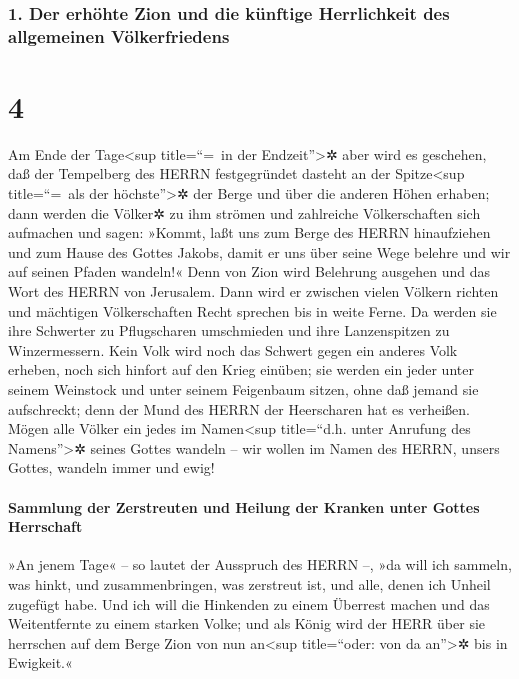 \hypertarget{der-erhuxf6hte-zion-und-die-kuxfcnftige-herrlichkeit-des-allgemeinen-vuxf6lkerfriedens}{%
\subsubsection{1. Der erhöhte Zion und die künftige Herrlichkeit des
allgemeinen
Völkerfriedens}\label{der-erhuxf6hte-zion-und-die-kuxfcnftige-herrlichkeit-des-allgemeinen-vuxf6lkerfriedens}}

\hypertarget{section-3}{%
\section{4}\label{section-3}}

 Am Ende der Tage\textless sup title=``=~in der
Endzeit''\textgreater✲ aber wird es geschehen, daß der Tempelberg des
HERRN festgegründet dasteht an der Spitze\textless sup title=``=~als der
höchste''\textgreater✲ der Berge und über die anderen Höhen erhaben;
dann werden die Völker✲ zu ihm strömen  und zahlreiche
Völkerschaften sich aufmachen und sagen: »Kommt, laßt uns zum Berge des
HERRN hinaufziehen und zum Hause des Gottes Jakobs, damit er uns über
seine Wege belehre und wir auf seinen Pfaden wandeln!« Denn von Zion
wird Belehrung ausgehen und das Wort des HERRN von Jerusalem.
 Dann wird er zwischen vielen Völkern richten und
mächtigen Völkerschaften Recht sprechen bis in weite Ferne. Da werden
sie ihre Schwerter zu Pflugscharen umschmieden und ihre Lanzenspitzen zu
Winzermessern. Kein Volk wird noch das Schwert gegen ein anderes Volk
erheben, noch sich hinfort auf den Krieg einüben;  sie
werden ein jeder unter seinem Weinstock und unter seinem Feigenbaum
sitzen, ohne daß jemand sie aufschreckt; denn der Mund des HERRN der
Heerscharen hat es verheißen.  Mögen alle Völker ein jedes
im Namen\textless sup title=``d.h. unter Anrufung des
Namens''\textgreater✲ seines Gottes wandeln -- wir wollen im Namen des
HERRN, unsers Gottes, wandeln immer und ewig!

\hypertarget{sammlung-der-zerstreuten-und-heilung-der-kranken-unter-gottes-herrschaft}{%
\paragraph{Sammlung der Zerstreuten und Heilung der Kranken unter Gottes
Herrschaft}\label{sammlung-der-zerstreuten-und-heilung-der-kranken-unter-gottes-herrschaft}}

 »An jenem Tage« -- so lautet der Ausspruch des HERRN --,
»da will ich sammeln, was hinkt, und zusammenbringen, was zerstreut ist,
und alle, denen ich Unheil zugefügt habe.  Und ich will
die Hinkenden zu einem Überrest machen und das Weitentfernte zu einem
starken Volke; und als König wird der HERR über sie herrschen auf dem
Berge Zion von nun an\textless sup title=``oder: von da
an''\textgreater✲ bis in Ewigkeit.«


